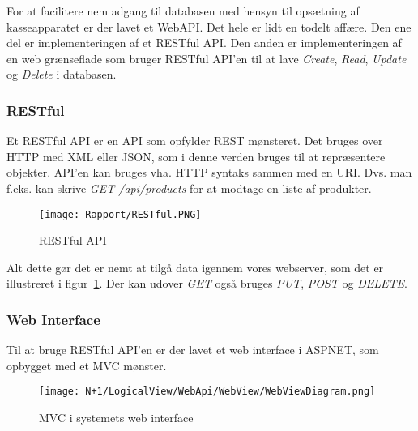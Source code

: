 For at facilitere nem adgang til databasen med hensyn til 
opsætning af kasseapparatet er der lavet et \gls{WebAPI}. 
Det hele er lidt en todelt affære. Den ene del er implementeringen af et \gls{RESTful} \gls{API}. 
Den anden er implementeringen af en web grænseflade som bruger \gls{RESTful} \gls{API}'en til at lave \textit{Create}, \textit{Read}, \textit{Update} og \textit{Delete} i databasen.

\subsubsection{RESTful}
Et \gls{RESTful} \gls{API} er en \gls{API} som opfylder \gls{REST} mønsteret. Det bruges over \gls{HTTP} med XML eller JSON, som i denne verden bruges til at repræsentere objekter.
\gls{API}'en kan bruges vha. \gls{HTTP} syntaks sammen med en \gls{URI}. Dvs. man f.eks. kan skrive \textit{GET /api/products} for at modtage en liste af produkter. 

\begin{figure}[H]
    \centering
	\texttt{[image: Rapport/RESTful.PNG]}
	\caption{RESTful API}
	\label{fig:RESTfulApi}
\end{figure} 

Alt dette gør det er nemt at tilgå data igennem vores webserver, som det er illustreret i figur~\ref{fig:RESTfulApi}. Der kan udover \textit{GET} også bruges \textit{PUT}, \textit{POST} og \textit{DELETE}. 

\subsubsection{Web Interface}
Til at bruge \gls{RESTful} \gls{API}'en er der lavet et web interface i \gls{ASPNET}, som opbygget med et \gls{MVC} mønster.

\begin{figure}[H]
    \centering
	\texttt{[image: N+1/LogicalView/WebApi/WebView/WebViewDiagram.png]}
	\caption{MVC i systemets web interface}
	\label{fig:MVCWebApi}
\end{figure}

